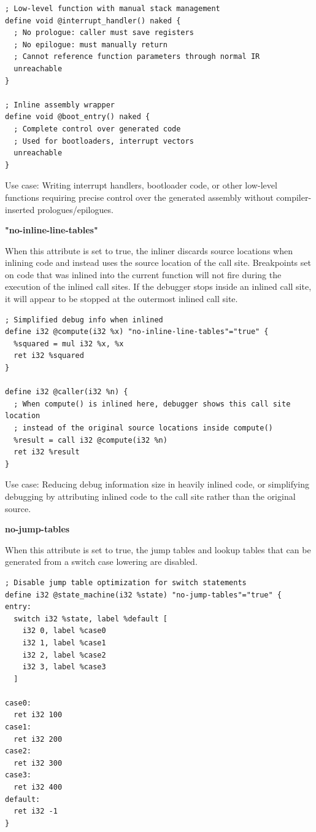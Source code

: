 \begin{lstlisting}[style=ir]
; Low-level function with manual stack management
define void @interrupt_handler() naked {
  ; No prologue: caller must save registers
  ; No epilogue: must manually return
  ; Cannot reference function parameters through normal IR
  unreachable
}

; Inline assembly wrapper
define void @boot_entry() naked {
  ; Complete control over generated code
  ; Used for bootloaders, interrupt vectors
  unreachable
}
\end{lstlisting}

Use case: Writing interrupt handlers, bootloader code, or other low-level functions requiring precise control over the generated assembly without compiler-inserted prologues/epilogues.

\textbf{"no-inline-line-tables"}

When this attribute is set to true, the inliner discards source locations when inlining code and instead uses the source location of the call site.
Breakpoints set on code that was inlined into the current function will not fire during the execution of the inlined call sites.
If the debugger stops inside an inlined call site, it will appear to be stopped at the outermost inlined call site.

\begin{lstlisting}[style=ir]
; Simplified debug info when inlined
define i32 @compute(i32 %x) "no-inline-line-tables"="true" {
  %squared = mul i32 %x, %x
  ret i32 %squared
}

define i32 @caller(i32 %n) {
  ; When compute() is inlined here, debugger shows this call site location
  ; instead of the original source locations inside compute()
  %result = call i32 @compute(i32 %n)
  ret i32 %result
}
\end{lstlisting}

Use case: Reducing debug information size in heavily inlined code, or simplifying debugging by attributing inlined code to the call site rather than the original source.

\textbf{no-jump-tables}

When this attribute is set to true, the jump tables and lookup tables that can be generated from a switch case lowering are disabled.

\begin{lstlisting}[style=ir]
; Disable jump table optimization for switch statements
define i32 @state_machine(i32 %state) "no-jump-tables"="true" {
entry:
  switch i32 %state, label %default [
    i32 0, label %case0
    i32 1, label %case1
    i32 2, label %case2
    i32 3, label %case3
  ]

case0:
  ret i32 100
case1:
  ret i32 200
case2:
  ret i32 300
case3:
  ret i32 400
default:
  ret i32 -1
}
\end{lstlisting}

